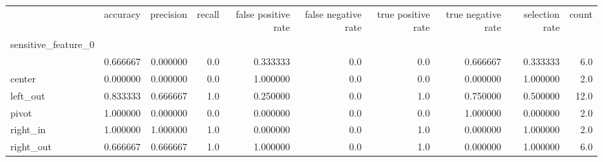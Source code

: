 \begin{tabular}{lrrrrrrrrr}
\toprule
{} &  accuracy &  precision &  recall &  false positive rate &  false negative rate &  true positive rate &  true negative rate &  selection rate &  count \\
sensitive\_feature\_0 &           &            &         &                      &                      &                     &                     &                 &        \\
\midrule
                    &  0.666667 &   0.000000 &     0.0 &             0.333333 &                  0.0 &                 0.0 &            0.666667 &        0.333333 &    6.0 \\
center              &  0.000000 &   0.000000 &     0.0 &             1.000000 &                  0.0 &                 0.0 &            0.000000 &        1.000000 &    2.0 \\
left\_out            &  0.833333 &   0.666667 &     1.0 &             0.250000 &                  0.0 &                 1.0 &            0.750000 &        0.500000 &   12.0 \\
pivot               &  1.000000 &   0.000000 &     0.0 &             0.000000 &                  0.0 &                 0.0 &            1.000000 &        0.000000 &    2.0 \\
right\_in            &  1.000000 &   1.000000 &     1.0 &             0.000000 &                  0.0 &                 1.0 &            0.000000 &        1.000000 &    2.0 \\
right\_out           &  0.666667 &   0.666667 &     1.0 &             1.000000 &                  0.0 &                 1.0 &            0.000000 &        1.000000 &    6.0 \\
\bottomrule
\end{tabular}
